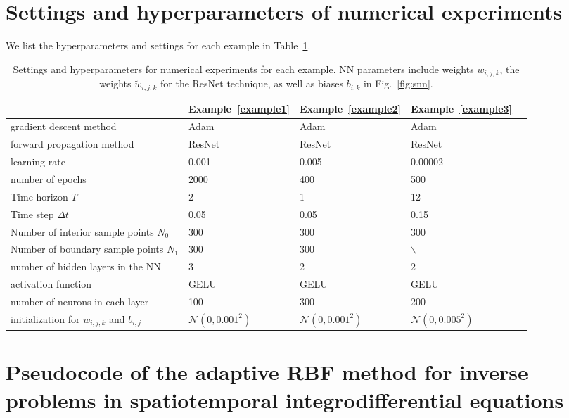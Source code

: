 \section{Settings and hyperparameters of numerical experiments}
\label{training_details}
We list the hyperparameters and settings for each example in Table~\ref{tab:setting}.

{\scriptsize \begin{table}[h!]
\centering
\caption{\footnotesize Settings and hyperparameters for numerical experiments for each example. NN parameters include weights $w_{i, j, k}$, the weights $\tilde{w}_{i, j, k}$ for the ResNet technique, as well as biases $b_{i, k}$ in Fig.~\ref{fig:snn}.} 
{\scriptsize\begin{tabular}{lllll}
\toprule
 & Example~\ref{example1} & Example~\ref{example2}  & Example~\ref{example3}\\
\midrule
gradient descent method & Adam & Adam  & Adam\\
forward propagation method &  ResNet  & ResNet & ResNet\\
learning rate & 0.001  & 0.005  & 0.00002\\
number of epochs &2000  & 400  & 500 \\
Time horizon $T$ & 2  & 1 & 12  \\
Time step $\Delta t$ &0.05 & 0.05 & 0.15\\
Number of interior sample points $N_0$ & 300 & 300 & 300\\
Number of boundary sample points $N_1$ & 300 & 300 & $\backslash$\\
number of hidden layers in the NN & 3  &2 & 2 \\
activation function &  GELU  &GELU & GELU\\
number of neurons in each layer & 100  &300 & 200  \\
initialization for $w_{i, j, k}$ and $b_{i, j}$  & $\mathcal{N}(0, 0.001^2)$ & $\mathcal{N}(0, 0.001^2)$  & $\mathcal{N}(0, 0.005^2)$ & \\

\bottomrule
\end{tabular}}
\label{tab:setting}
\end{table}}

\section{Pseudocode of the adaptive RBF method for inverse problems in spatiotemporal integrodifferential equations}
\label{pseudocode_inverse}

